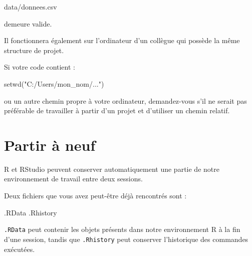 \documentclass[
  letterpaper,
  DIV=11,
  numbers=noendperiod]{scrreprt}
\newenvironment{Shaded}{\begin{snugshade}}{\end{snugshade}}
\newcommand{\FunctionTok}[1]{\textcolor[rgb]{0.28,0.35,0.67}{#1}}
\newcommand{\NormalTok}[1]{\textcolor[rgb]{0.00,0.23,0.31}{#1}}
\newcommand{\StringTok}[1]{\textcolor[rgb]{0.13,0.47,0.30}{#1}}
\begin{document}
\begin{Shaded}
\begin{Highlighting}[]
\NormalTok{data/donnees.csv}
\end{Highlighting}
\end{Shaded}

demeure valide.

Il fonctionnera également sur l'ordinateur d'un collègue qui possède la
même structure de projet.

\begin{tcolorbox}[enhanced jigsaw, arc=.35mm, title=\textcolor{quarto-callout-tip-color}{\faLightbulb}\hspace{0.5em}{Une bonne règle}, colback=white, left=2mm, rightrule=.15mm, toptitle=1mm, opacityback=0, bottomtitle=1mm, breakable, colframe=quarto-callout-tip-color-frame, coltitle=black, toprule=.15mm, titlerule=0mm, opacitybacktitle=0.6, bottomrule=.15mm, colbacktitle=quarto-callout-tip-color!10!white, leftrule=.75mm]

Si votre code contient :

\begin{Shaded}
\begin{Highlighting}[]
\FunctionTok{setwd}\NormalTok{(}\StringTok{"C:/Users/mon\_nom/..."}\NormalTok{)}
\end{Highlighting}
\end{Shaded}

ou un autre chemin propre à votre ordinateur, demandez-vous s'il ne
serait pas préférable de travailler à partir d'un projet et d'utiliser
un chemin relatif.

\end{tcolorbox}

\section{Partir à neuf}\label{partir-uxe0-neuf}

R et RStudio peuvent conserver automatiquement une partie de notre
environnement de travail entre deux sessions.

Deux fichiers que vous avez peut-être déjà rencontrés sont :

\begin{Shaded}
\begin{Highlighting}[]
\NormalTok{.RData}
\NormalTok{.Rhistory}
\end{Highlighting}
\end{Shaded}

\texttt{.RData} peut contenir les objets présents dans notre
environnement R à la fin d'une session, tandis que \texttt{.Rhistory}
peut conserver l'historique des commandes exécutées.
\end{document}
